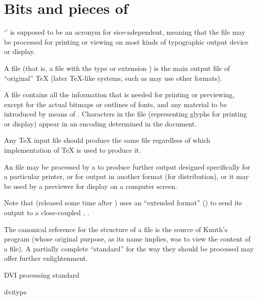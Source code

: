 
\section{Bits and pieces of \AllTeX{}}


`' is supposed to be an acronym for
eice-ndependent, meaning that the file may be
processed for printing or viewing on most kinds of typographic output
device or display.

A  file (that is, a file with the type or extension
) is the main output file of ``original'' \TeX{} (later
\TeX{}-like systems, such as  may use
other formats).

A  file contains all the information that is needed for
printing or previewing, except for the actual bitmaps or outlines of
fonts, and any material to be introduced by means of %
.  Characters in the
 file (representing glyphs for printing or display) appear
in an encoding determined in the document.

Any \TeX{} input file should produce the same  file
regardless of which implementation of \TeX{} is used to produce it.

An  file may be processed by a 
to produce further output designed specifically for a particular
printer, or for output in another format (for distribution), or it may
be used by a previewer for display on a computer screen.

Note that  (released some time after
\pdftex{}) uses an ``extended  format'' () to send
its output to a close-coupled ,
.

The canonical reference for the structure of a  file is the
source of Knuth's program  (whose original purpose,
as its name implies, was to view the content of a  file).
A partially complete ``standard'' for the way they should be
processed may offer further enlightenment.
\begin{ctanrefs}
\item[\nothtml{rmfamily}DVI processing standard]
\item[dvitype]
\end{ctanrefs}

